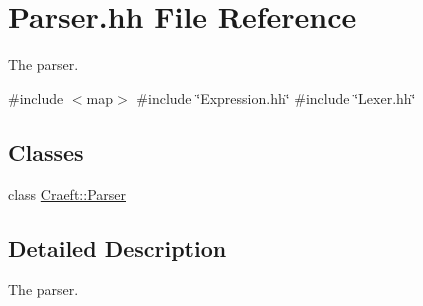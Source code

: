 \hypertarget{_parser_8hh}{}\section{Parser.\+hh File Reference}
\label{_parser_8hh}


The parser.  


{\ttfamily \#include $<$map$>$}\newline
{\ttfamily \#include \char`\"{}Expression.\+hh\char`\"{}}\newline
{\ttfamily \#include \char`\"{}Lexer.\+hh\char`\"{}}\newline
\subsection*{Classes}
\begin{DoxyCompactItemize}
\item 
class \hyperlink{class_craeft_1_1_parser}{Craeft\+::\+Parser}
\end{DoxyCompactItemize}


\subsection{Detailed Description}
The parser. 

